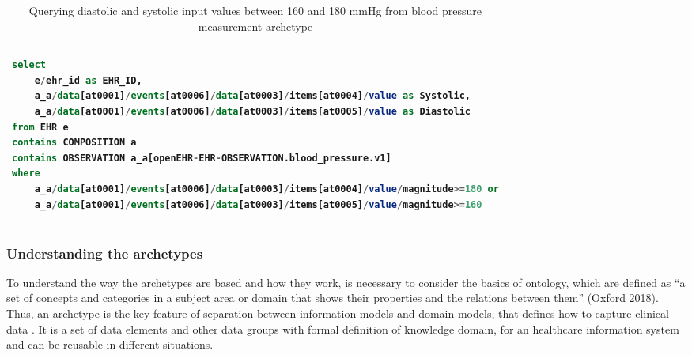 \documentclass[mim_thesis.tex]{subfiles}
\begin{document}
\begin{table}[H]
	\centering
\caption{Querying diastolic and systolic input values between 160 and 180 mmHg from blood pressure measurement archetype}
\label{tab:bp_aql}
\begin{tabular}{l}
\toprule[2pt]
\begin{lstlisting}[language=SQL]
select
    e/ehr_id as EHR_ID,
    a_a/data[at0001]/events[at0006]/data[at0003]/items[at0004]/value as Systolic,
    a_a/data[at0001]/events[at0006]/data[at0003]/items[at0005]/value as Diastolic
from EHR e
contains COMPOSITION a
contains OBSERVATION a_a[openEHR-EHR-OBSERVATION.blood_pressure.v1]
where
    a_a/data[at0001]/events[at0006]/data[at0003]/items[at0004]/value/magnitude>=180 or
    a_a/data[at0001]/events[at0006]/data[at0003]/items[at0005]/value/magnitude>=160
\end{lstlisting}
\tabularnewline \bottomrule[2pt]
\end{tabular}
\end{table}

\newpage
\subsubsection{Understanding the archetypes}
To understand the way the archetypes are based and how they work, is necessary to consider the basics of ontology, which are defined as “a set of concepts and categories in a subject area or domain that shows their properties and the relations between them” (Oxford 2018). Thus, an archetype is the key feature of separation between information models and domain models, that defines how to capture clinical data \citep{Beale2007}. It is a set of data elements and other data groups with formal definition of knowledge domain, for an healthcare information system and can be reusable in different situations.
\end{document}
